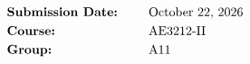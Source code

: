 \vspace{0pt plus 1filll} %

\begin{alignat*}{2}
&\text{ \textbf{Submission Date:} } &\quad& \text{\today}                 \\
&\text{ \textbf{Course:} }          &\quad& \text{AE3212-II}              \\
&\text{ \textbf{Group:} }           &\quad& \text{A11}
\end{alignat*}

\clearpage\thispagestyle{empty}\null\newpage